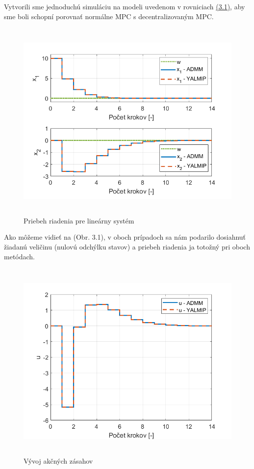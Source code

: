 Vytvorili sme jednoduchú simuláciu na modeli uvedenom v rovniciach \hyperref[math:model_HB]{(3.1)}, aby sme boli schopní porovnať normálne MPC s decentralizovaným MPC.
\begin{figure}[H]
	\centering
	\includegraphics[width=13cm,height=10cm]{images/Hmotny_bod/Priebeh_riadenia}
	\caption{Priebeh riadenia pre lineárny systém}
	\label{fig1: PRLS}
\end{figure}
Ako môžeme vidieť na (Obr. 3.1), v oboch prípadoch sa nám podarilo dosiahnuť žiadanú veličinu (nulovú odchýlku stavov) a priebeh riadenia ja totožný pri oboch metódach.
\newpage
\begin{figure}[H]
	\centering
	\includegraphics[width=13cm,height=10cm]{images/Hmotny_bod/Akcne_zasahy}
	\caption{Vývoj akčných zásahov}
	\label{fig2:AZLS}
\end{figure}
